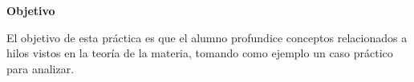 \documentclass[a4paper,11pt]{exam}
\begin{document}
\maketitle

\textbf{Objetivo}

El objetivo de esta práctica es que el alumno profundice conceptos relacionados a hilos
vistos en la teoría de la materia, tomando como ejemplo un caso práctico para analizar.


\end{document}
